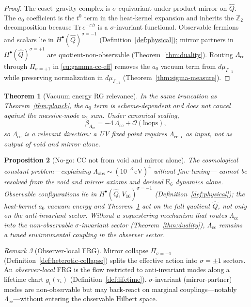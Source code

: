 \documentclass[aps,prd,onecolumn,amsmath,amssymb,nofootinbib,11pt]{revtex4-2}
\numberwithin{equation}{section}
\theoremstyle{plain}
\newtheorem{theorem}{Theorem}[section]
\newtheorem{proposition}[theorem]{Proposition}
\theoremstyle{definition}
\theoremstyle{remark}
\newtheorem{remark}[theorem]{Remark}
\newcommand{\E}[1]{\mathrm{E}_{#1}}
\begin{document}
\begin{proof}
The coset--gravity complex is $\sigma$-equivariant under product mirror on
$\hat Q$. The $a_0$ coefficient is the $t^0$ term in the heat-kernel
expansion and inherits the $\mathbb{Z}_2$ decomposition because
$\mathrm{Tr}\,e^{-t\mathcal{D}}$ is a $\sigma$-invariant functional.
Observable fermions and scalars lie in $H^\bullet(\hat Q)^{\sigma=-1}$
(Definition~\ref{def:physical}); mirror partners in
$H^\bullet(\hat Q)^{\sigma=+1}$ are quotient-non-observable
(Theorem~\ref{thm:duality}). Routing $\Lambda_{\mathrm{cc}}$ through
$\Pi_{\sigma=+1}$ in \eqref{eq:gamma-cc-eff} removes the $a_0$ vacuum term
from $d\mu_{\Gamma_{-1}}$ while preserving normalization in
$d\mu_{\Gamma_{+1}}$ (Theorem~\ref{thm:sigma-measure}).
\end{proof}

\begin{theorem}[Vacuum energy RG relevance]\label{thm:cc-rg}
In the same truncation as Theorem~\ref{thm:planck}, the $a_0$ term is
scheme-dependent and does not cancel against the massive-mode $a_2$ sum. Under
canonical scaling,
\begin{equation}\label{eq:beta-Lambda}
  \beta_{\Lambda_{\mathrm{cc}}}
  =-4\,\Lambda_{\mathrm{cc}}+\mathcal{O}(\text{loops}),
\end{equation}
so $\Lambda_{\mathrm{cc}}$ is a \emph{relevant} direction: a UV fixed point
requires $\Lambda_{\mathrm{cc},\star}$ as input, not as output of void and
mirror alone.
\end{theorem}

\begin{proposition}[No-go: CC not from void and mirror alone]
\label{prop:cc-nogo}
The cosmological constant problem---explaining
$\Lambda_{\mathrm{obs}}\sim(10^{-3}\,\mathrm{eV})^4$ without fine-tuning---
cannot be resolved from the void and mirror axioms and derived $\E{6}$
dynamics \emph{alone}. Observable configurations lie in
$H^\bullet(\hat Q,V_{16})^{\sigma=-1}$ (Definition~\ref{def:physical}); the
heat-kernel $a_0$ vacuum energy and Theorem~\ref{thm:cc-rg} act on the full
quotient $\hat Q$, not only on the anti-invariant sector. Without a
sequestering mechanism that routes $\Lambda_{\mathrm{cc}}$ into the
non-observable $\sigma$-invariant sector (Theorem~\ref{thm:duality}),
$\Lambda_{\mathrm{cc}}$ remains a tuned environmental coupling in the
observer sector.
\end{proposition}

\begin{remark}[Observer-local FRG]\label{rmk:observer-frg}
Mirror collapse $\Pi_{\sigma=-1}$ (Definition~\ref{def:heterotic-collapse})
splits the effective action into $\sigma=\pm1$ sectors. An \emph{observer-local}
FRG is the flow restricted to anti-invariant modes along a lifetime chart
$g_\iota(\tau_\iota)$ (Definition~\ref{def:lifetime}). $\sigma$-invariant
(mirror-partner) modes are non-observable but may back-react on marginal
couplings---notably $\Lambda_{\mathrm{cc}}$---without entering the observable
Hilbert space.
\end{remark}
\end{document}
